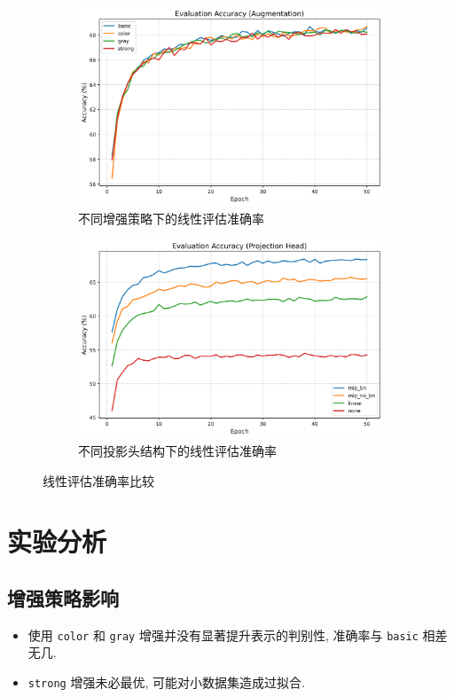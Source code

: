 \documentclass[11pt]{article}
\begin{document}
\begin{figure}[htbp]
	\centering
	\begin{subfigure}[htbp]{0.45\textwidth}
		\centering
		\includegraphics[width=\textwidth]{figure/eval_acc_augment.png}
		\caption{不同增强策略下的线性评估准确率}
	\end{subfigure}
	\hfill
	\begin{subfigure}[htbp]{0.45\textwidth}
		\centering
		\includegraphics[width=\textwidth]{figure/eval_acc_head.png}
		\caption{不同投影头结构下的线性评估准确率}
	\end{subfigure}
	\caption{线性评估准确率比较}
\end{figure}

\section{\textbf{实验分析}}

\subsection{增强策略影响}
\begin{itemize}
\item 使用 \texttt{color} 和 \texttt{gray} 增强并没有显著提升表示的判别性, 准确率与 \texttt{basic} 相差无几.
\item \texttt{strong} 增强未必最优, 可能对小数据集造成过拟合.
\end{itemize}
\end{document}

